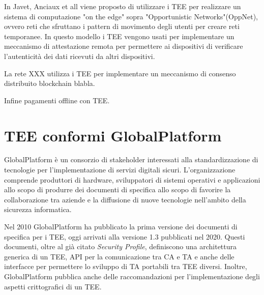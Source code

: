 \documentclass[12pt,italian]{report}
\begin{document}
In Javet, Anciaux et all\cite{edgeletcomputing} viene proposto di utilizzare i
TEE per realizzare un sistema di computazione "on the edge" sopra
"Opportunistic Networks"(OppNet), ovvero reti che sfruttano i
pattern di movimento degli utenti per creare reti temporanee.
In questo modello i TEE vengono usati per implementare un meccanismo di
attestazione remota per permettere ai dispositivi di verificare l'autenticità
dei dati ricevuti da altri dispositivi.

La rete XXX\cite{???} utilizza i TEE per implementare un meccanismo di consenso distribuito
blockchain blabla.

Infine \cite{??} pagamenti offline con TEE.

\section{TEE conformi GlobalPlatform}
\label{sec:tee-conformi-globalplatform}
GlobalPlatform è un consorzio di stakeholder interessati alla
standardizzazione di tecnologie per l'implementazione di servizi digitali
sicuri. L'organizzazione comprende produttori di hardware, sviluppatori di
sistemi operativi e applicazioni allo scopo di produrre dei documenti di
specifica allo scopo di favorire la collaborazione tra aziende e la
diffusione di nuove tecnologie nell'ambito della sicurezza informatica.

Nel 2010 GlobalPlatform ha pubblicato la prima versione dei documenti di
specifica per i TEE, oggi arrivati alla versione 1.3 pubblicati nel 2020.
Questi documenti, oltre al già citato \textit{Security Profile}, definiscono
una architettura generica di un TEE, API per la comunicazione tra CA e TA
e anche delle interfacce per permettere lo sviluppo di TA portabili tra TEE
diversi. Inoltre, GlobalPlatform pubblica anche delle raccomandazioni per
l'implementazione degli aspetti crittografici di un TEE.
\end{document}
